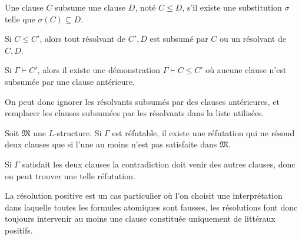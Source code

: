 \documentclass[9pt]{beamer}
\begin{document}
\begin{frame}
\begin{definition}
  Une clause $C$ subsume une clause $D$, noté $C\leq D$, s'il existe une substitution $\sigma$ telle que $\sigma(C)\subseteq D$.
\end{definition}

\begin{theorem}
  Si $C\leq C'$, alors tout résolvant de $C',D$ est subsumé par $C$ ou un résolvant de $C,D$.
\end{theorem}

\begin{corollary}
  Si $\Gamma\vdash C'$, alors il existe une démonstration $\Gamma\vdash C\leq C'$ où aucune clause n'est subsumée par une clause antérieure.
\end{corollary}

On peut donc ignorer les résolvants subsumés par des clauses antérieures, et remplacer les clauses subsumées par les résolvants dans la liste utilisées.
\end{frame}

\begin{frame}
\begin{theorem}
  Soit $\mathfrak{M}$ une $L$-structure. Si $\Gamma$ est réfutable, il existe une réfutation qui ne résoud deux clauses que si l'une au moins n'est pas satisfaite dans $\mathfrak{M}$.
\end{theorem}

Si $\Gamma$ satisfait les deux clauses la contradiction doit venir des autres clauses, donc on peut trouver une telle réfutation.

La résolution positive est un cas particulier où l'on choisit une interprétation dans laquelle toutes les formules atomiques sont fausses, les résolutions font donc toujours intervenir au moins une clause constituée uniquement de littéraux positifs.
\end{frame}
\end{document}
